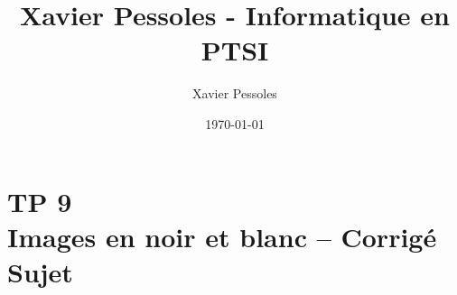 \documentclass[
	fontsize=10pt, %
	twoside=true, %
]{kaobook}
\newcommand{\repRel}{../../../..}
\newcommand{\repStyle}{\repRel/Style}
\begin{document}

\titlehead{Xavier Pessoles - Informatique en PTSI}
\title[Xavier Pessoles - Informatique en PTSI]{Xavier Pessoles - Informatique en PTSI}
\author[XP]{Xavier Pessoles}
\date{\today}


\begingroup %
\endgroup

%
\mainmatter %
%
%
%
%


\setcounter{margintocdepth}{\sectiontocdepth}
\marginlayout
\graphicspath{{\repStyle/png}}

\pagestyle{xp.scrheadings}


%



\newcommand{\repExo}{}
\newcommand{\nomExo}{}

\livrettrue %
\livrettrue
\colletrue


\renewcommand{\repExo}{\repRel/Informatique/Exercices/S1_07_Images/}
\renewcommand{\nomExo}{04_ImageNB}
\graphicspath{{\repStyle/png}{\repExo\nomExo/images}}


\chapter*{TP 9 \\ 
Images en noir et blanc -- \ifprof Corrigé \else Sujet \fi}

\iflivret {} \else
\ifprof  {} \else \fi
\fi






%
% 
%
\end{document}
